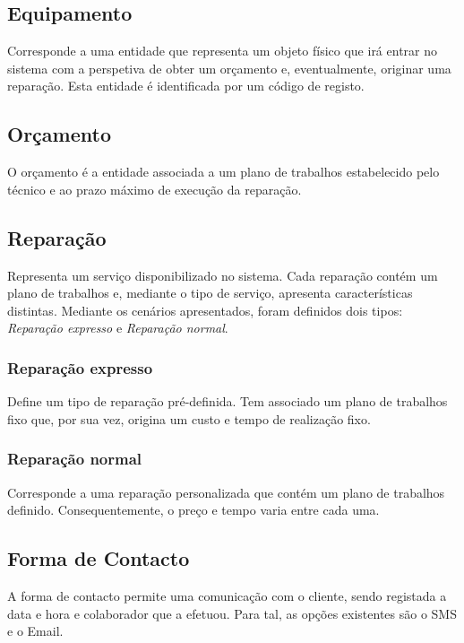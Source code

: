 \documentclass[a4paper,12pt]{scrreprt}
\begin{document}
\subsection{Equipamento} \label{ent_equipamento}
Corresponde a uma entidade que representa um objeto físico que irá entrar no sistema com a perspetiva de obter um orçamento e,
eventualmente, originar uma reparação.
Esta entidade é identificada por um código de registo.

\subsection{Orçamento} \label{ent_orcamento}
O orçamento é a entidade associada a um plano de trabalhos estabelecido pelo técnico e ao prazo máximo de execução da reparação.

\subsection{Reparação} \label{ent_reparacao}
Representa um serviço disponibilizado no sistema. Cada reparação contém um plano de trabalhos e,
mediante o tipo de serviço, apresenta características distintas.
Mediante os cenários apresentados, foram definidos dois tipos: \textit{Reparação expresso} e \textit{Reparação normal}.

\subsubsection{Reparação expresso} \label{ent_reparacao-expresso}
Define um tipo de reparação pré-definida.
Tem associado um plano de trabalhos fixo que, por sua vez, origina um custo e tempo de realização fixo.

\subsubsection{Reparação normal} \label{ent_reparacao-normal}
Corresponde a uma reparação personalizada que contém um plano de trabalhos definido.
Consequentemente, o preço e tempo varia entre cada uma.

\subsection{Forma de Contacto} \label{ent_formas-contacto}
A forma de contacto permite uma comunicação com o cliente, sendo registada a data e hora e colaborador que a efetuou.
Para tal, as opções existentes são o SMS e o Email.
\end{document}
